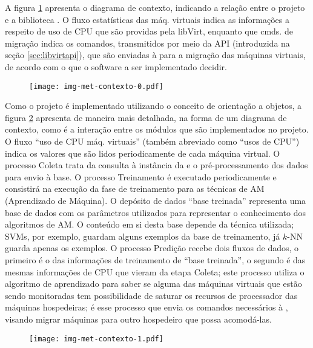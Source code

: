 A figura \ref{fig:contexto0} apresenta o diagrama de contexto,
indicando a relação entre o projeto e a biblioteca \libvirt{}. O fluxo
estatísticas das máq. virtuais indica as informações a respeito de uso de
CPU que são providas pela libVirt, enquanto que cmds. de migração indica os
comandos, transmitidos por meio da API (introduzida na seção
\ref{sec:libvirtapi}), que são enviadas à \libvirt{} para a migração das
máquinas virtuais, de acordo com o que o software a ser implementado
decidir.

\begin{figure}[htp]
\centering
\texttt{[image: img-met-contexto-0.pdf]}
\label{fig:contexto0}
\end{figure}

Como o projeto é implementado utilizando o conceito de orientação a
objetos, a figura \ref{fig:contexto1} apresenta
de maneira mais detalhada, na forma de um diagrama de contexto, como é a
interação entre os módulos que são implementados no projeto. O fluxo
“uso de CPU máq. virtuais” (também abreviado como “usos de CPU”)
indica os valores que são lidos periodicamente de cada máquina virtual.  O
processo Coleta trata da consulta à instância da \libvirt{} e o
pré-processamento dos dados para envio à base. O processo Treinamento
é executado periodicamente e consistirá na execução da fase de treinamento
para as técnicas de AM (Aprendizado de Máquina). O depósito de dados
``base treinada'' representa uma base de dados com os parâmetros
utilizados para representar o conhecimento dos algoritmos de AM. O conteúdo em
si desta base depende da técnica utilizada; SVMs, por exemplo, guardam alguns
exemplos da base de treinamento, já $k$-NN guarda apenas os
exemplos. O processo Predição recebe dois fluxos de dados, o primeiro
é o das informações de treinamento de ``base treinada'', o segundo é
das mesmas informações de CPU que vieram da etapa Coleta; este
processo utiliza o algoritmo de aprendizado para saber se alguma das máquinas
virtuais que estão sendo monitoradas tem possibilidade de saturar os recursos
de processador das máquinas hospedeiras; é esse processo que envia os comandos
necessários à \libvirt{}, visando migrar máquinas para outro hospedeiro que
possa acomodá-las.

\begin{figure}[htp]
\centering
\texttt{[image: img-met-contexto-1.pdf]}
\label{fig:contexto1}
\end{figure}


